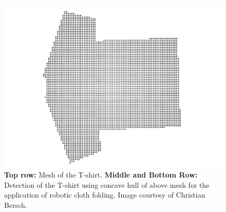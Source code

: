 \documentclass[conference]{IEEEtran}
\begin{document}
\begin{figure}[htbp]
  \includegraphics[width=0.8\columnwidth]{experiments/tshirt/tshirt_pcd.jpg}
  \begin{minipage}[t]{0.49\linewidth} 
    \centering 
  \end{minipage} 
  \begin{minipage}[t]{0.49\linewidth} 
    \centering 
  \end{minipage} 
  \begin{minipage}[t]{0.49\linewidth} 
    \centering 
  \end{minipage} 
  \begin{minipage}[t]{0.49\linewidth} 
    \centering 
  \end{minipage} 
  \caption{\textbf{Top row:} Mesh of the T-shirt. \textbf{Middle and Bottom Row:} 
Detection of the T-shirt using concave hull of above mesh for the application of robotic 
cloth folding. Image courtesy of Christian Bersch.}
  \label{fig:tshirt}
\end{figure}
\end{document}
